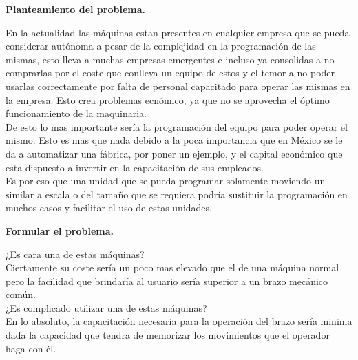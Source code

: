 \documentclass[letterpaper]{article}
\begin{document}
\begin{large}
    \begin{LARGE}
        \textbf{Planteamiento del problema.}\\
    \end{LARGE}%
    \begin{large}
    En la actualidad las máquinas estan presentes en cualquier empresa que se pueda considerar autónoma a pesar de la complejidad en la programación de las mismas, esto lleva a muchas empresas emergentes e incluso ya consolidas a no comprarlas por el coste que conlleva un equipo de estos y el temor a no poder usarlas correctamente por falta de personal capacitado para operar las mismas en la empresa. Esto crea problemas ecnómico, ya que no se aprovecha el óptimo funcionamiento de la maquinaria.\\
    De esto lo mas importante sería la programación del equipo para poder operar el mismo. Esto es mas que nada debido a la poca importancia que en México se le da a automatizar una fábrica, por poner un ejemplo, y el capital económico que esta dispuesto a invertir en la capacitación de sus empleados.\\
    Es por eso que una unidad que se pueda programar solamente moviendo un similar a escala o del tamaño que se requiera podría sustituir la programación en muchos casos y facilitar el uso de estas unidades.\\
    \end{large}
\end{large}

\begin{large}
    \begin{LARGE}
       \textbf{Formular el problema.}\\
    \end{LARGE}
    
    ¿Es cara una de estas máquinas?\\
    Ciertamente su coste sería un poco mas elevado que el de una máquina normal pero la facilidad que brindaría al usuario sería superior a un brazo mecánico común.\\

    ¿Es complicado utilizar una de estas máquinas?\\
    En lo absoluto, la capacitación necesaria para la operación del brazo sería minima dada la capacidad que tendra de memorizar los movimientos que el operador haga con él.\\
    
    
\end{large}
\end{document}
